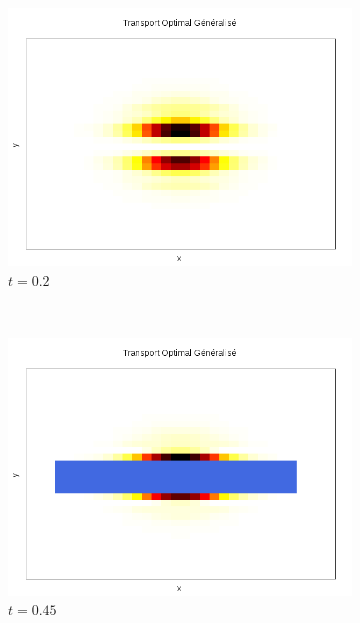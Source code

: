 \documentclass[a4paper,12pt]{article}
\begin{document}
\begin{figure}
\begin{subfigure}[b]{0.18\linewidth}
\includegraphics[width=\linewidth]{img/2DObstacle/T_00007.png}
\caption{$t=0.2$}
\end{subfigure}
~
\begin{subfigure}[b]{0.18\linewidth}
\includegraphics[width=\linewidth]{img/2DObstacle/T_00014.png}
\caption{$t=0.45$}
\end{subfigure}
~
\begin{subfigure}[b]{0.18\linewidth}

\end{subfigure}
\end{figure}
\end{document}
